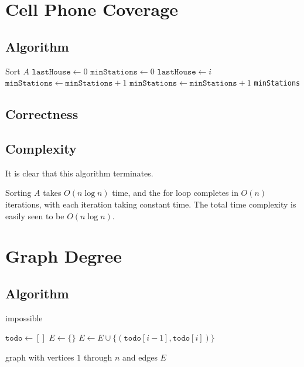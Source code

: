 \documentclass[12pt]{article}
\begin{document}
\section{Cell Phone Coverage}

\subsection{Algorithm}

\begin{algorithmic}[1]
    \State Sort $A$
    \State $\texttt{lastHouse} \gets 0$
    \State $\texttt{minStations} \gets 0$
            \State $\texttt{lastHouse} \gets i$
            \State $\texttt{minStations} \gets \texttt{minStations} + 1$
        \EndIf
    \EndFor
    \State $\texttt{minStations} \gets \texttt{minStations} + 1$
    \State \Return \texttt{minStations}
\end{algorithmic}

\subsection{Correctness}

\subsection{Complexity}

It is clear that this algorithm terminates.

Sorting $A$ takes $O(n \log n)$ time, and the for loop completes in $O(n)$
iterations, with each iteration taking constant time.
The total time complexity is easily seen to be $\boxed{O(n \log n)}$.

\pagebreak

\section{Graph Degree}

\subsection{Algorithm}

\begin{algorithmic}[1]
        \State \Return impossible
    \EndIf

    \item[]
    \State $\texttt{todo} \gets []$
    \State $E \gets \{\}$
        \State $E \gets E \cup \{(\texttt{todo}[i-1], \texttt{todo}[i])\}$
    \EndFor

    \item[]
    \State \Return graph with vertices $1$ through $n$ and edges $E$
\end{algorithmic}
\end{document}
